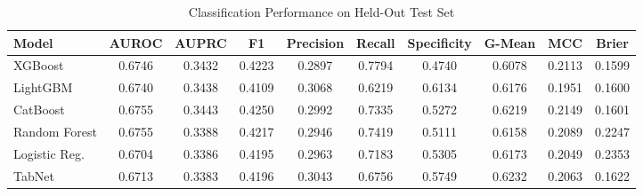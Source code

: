\begin{table}
\centering
\caption{Classification Performance on Held-Out Test Set}
\label{tab:results}
\begin{tabular}{lccccccccc}
\toprule
Model & AUROC & AUPRC & F1 & Precision & Recall & Specificity & G-Mean & MCC & Brier \\
\midrule
XGBoost & 0.6746 & 0.3432 & 0.4223 & 0.2897 & 0.7794 & 0.4740 & 0.6078 & 0.2113 & 0.1599 \\
LightGBM & 0.6740 & 0.3438 & 0.4109 & 0.3068 & 0.6219 & 0.6134 & 0.6176 & 0.1951 & 0.1600 \\
CatBoost & 0.6755 & 0.3443 & 0.4250 & 0.2992 & 0.7335 & 0.5272 & 0.6219 & 0.2149 & 0.1601 \\
Random Forest & 0.6755 & 0.3388 & 0.4217 & 0.2946 & 0.7419 & 0.5111 & 0.6158 & 0.2089 & 0.2247 \\
Logistic Reg. & 0.6704 & 0.3386 & 0.4195 & 0.2963 & 0.7183 & 0.5305 & 0.6173 & 0.2049 & 0.2353 \\
TabNet & 0.6713 & 0.3383 & 0.4196 & 0.3043 & 0.6756 & 0.5749 & 0.6232 & 0.2063 & 0.1622 \\
\bottomrule
\end{tabular}
\end{table}
